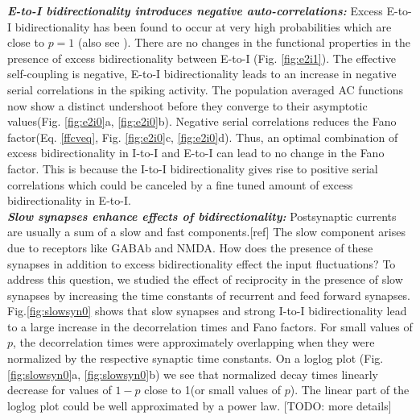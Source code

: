 \emph{\textbf{E-to-I bidirectionality introduces negative auto-correlations:}} Excess E-to-I bidirectionality has been found to occur at very high probabilities which are close to $p=1$ \cite{Yoshimura2005, Otsuka2009}(also see \cite{Avermann2012}). There are no changes in the functional properties in the presence of excess bidirectionality between E-to-I (Fig. \ref{fig:e2i1}). The effective self-coupling is negative, E-to-I bidirectionality leads to an increase in negative serial correlations in the spiking activity. The population averaged AC functions now show a distinct undershoot before they converge to their asymptotic values(Fig. \ref{fig:e2i0}a, \ref{fig:e2i0}b). Negative serial correlations reduces the Fano factor(Eq. \ref{ffcveq}, Fig. \ref{fig:e2i0}c, \ref{fig:e2i0}d). Thus, an optimal combination of excess bidirectionality in I-to-I and E-to-I can lead to no change in the Fano factor. This is because the I-to-I bidirectionality gives rise to positive serial correlations which could be canceled by a fine tuned amount of excess bidirectionality in E-to-I. \\

\emph{\textbf{Slow synapses enhance effects of bidirectionality:}} Postsynaptic currents are usually a sum of a slow and fast components.[ref] The slow component arises due to receptors like GABAb and NMDA. How does the presence of these synapses in addition to excess bidirectionality effect the input fluctuations? To address this question, we studied the effect of reciprocity in the presence of slow synapses by increasing the time constants of recurrent and feed forward synapses. Fig.\ref{fig:slowsyn0} shows that slow synapses and strong I-to-I bidirectionality lead to a large increase in the decorrelation times and Fano factors. For small values of $p$, the decorrelation times were approximately overlapping when they were normalized by the respective synaptic time constants. On a loglog plot (Fig. \ref{fig:slowsyn0}a, \ref{fig:slowsyn0}b) we see that normalized decay times linearly decrease for values of $1-p$ close to 1(or small values of $p$). The linear part of the loglog plot could be well approximated by a power law. [TODO: more details]\\

